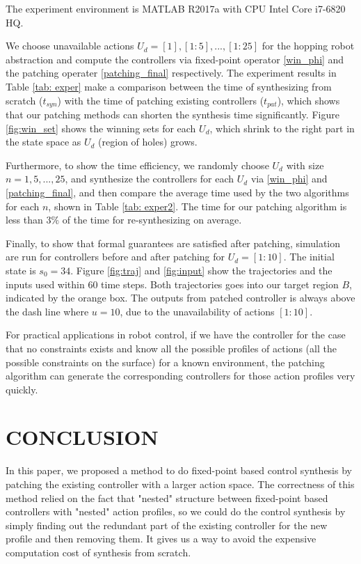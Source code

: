 The experiment environment is MATLAB R2017a with CPU Intel Core  i7-6820 HQ.

We choose unavailable actions $ U_d= [1],[1:5],...,[1:25] $ for the hopping robot abstraction and compute the controllers via fixed-point operator \eqref{win_phi} and the patching operater \eqref{patching_final} respectively.  The experiment results in Table \ref{tab: exper} make a comparison between the time of synthesizing from scratch ($ t_{syn} $) with the time of patching existing controllers ($ t_{pat} $), which shows that our patching methods can shorten the synthesis time significantly. Figure \ref{fig:win_set} shows the winning sets for each $ U_d $, which shrink to the right part in the state space as $ U_d $ (region of holes) grows.

Furthermore, to show the time efficiency, we randomly choose $ U_d $ with size $n = 1,5,...,25 $, and synthesize the controllers for each $ U_d $ via \eqref{win_phi} and \eqref{patching_final}, and then compare the average time used by the two algorithms for each $ n $, shown in Table \ref{tab: exper2}. The time for our patching algorithm is less than $ 3\% $ of the time for re-synthesizing on average.

Finally, to show that formal guarantees are satisfied after patching, simulation are run for controllers before and after patching for $ U_d =[1:10]$. The initial state is $ s_0=34 $. Figure \ref{fig:traj} and \ref{fig:input} show the trajectories and the inputs used within $ 60 $ time steps. Both trajectories goes into our target region $ B $, indicated by the orange box. The outputs from patched controller is always above the dash line where $ u=10 $, due to the unavailability of actions $[1:10] $.

For practical applications in robot control, if we have the controller for the case that no constraints exists and know all the possible profiles of actions (all the possible constraints on the surface) for a known environment, the patching algorithm can generate the corresponding controllers for those action profiles very quickly. 

\section{CONCLUSION}
In this paper, we proposed a method to do fixed-point based control synthesis by patching the existing controller with a larger action space. The correctness of this method relied on the fact that "nested" structure between fixed-point based controllers with "nested" action profiles, so we could do the control synthesis by simply finding out the redundant part of the existing controller for the new profile and then removing them. It gives us a way to avoid the expensive computation cost of synthesis from scratch. 

